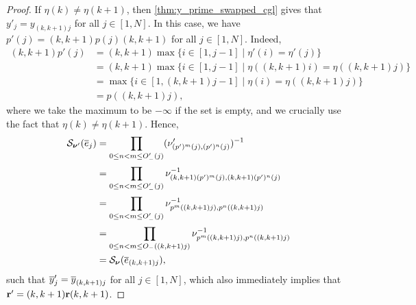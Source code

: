 \begin{proof}

	If $\eta(k) \neq \eta(k+1)$, then \cref{thm:y_prime_swapped_cgl} gives that $y'_j =
		y_{(k,k+1)j}$ for all $j \in [1, N]$. In this case, we have $p'(j) = (k, k+1)p(j)(k,
		k+1)$ for all $j\in [1,N]$. Indeed,
	\begin{align*}
		(k, k+1) p'(j) & = (k, k+1)\max\{i \in [1, j-1] \mid \eta'(i) = \eta'(j)\}                \\
		               & = (k, k+1)\max\{i \in [1, j-1] \mid \eta((k, k+1) i) = \eta((k, k+1)j)\} \\
		               & = \max\{ i \in [1, (k, k+1)j-1] \mid \eta(i) = \eta((k, k+1)j)\}         \\
		               & = p((k, k+1)j),
	\end{align*}
	where we take the maximum to be $-\infty$ if the set is empty, and we crucially use the
	fact that $\eta(k) \neq \eta(k+1)$. Hence,
	\begin{align*}
		\mathcal{S}_{\boldsymbol{\nu}'}(\overline{e}_j) & = \prod_{0 \leq n < m \leq O'_{-}(j)}(\nu'_{(p')^m (j), (p')^n (j)})^{-1}                \\
		                    & = \prod_{0 \leq n < m \leq O'_{-}(j)}\nu^{-1}_{(k, k+1)(p')^m (j), (k, k+1)(p')^n (j)}   \\
		                    & = \prod_{0 \leq n < m \leq O'_{-}(j)}\nu^{-1}_{p^m ((k, k+1)j), p^n ((k, k+1)j)}         \\
		                    & = \prod_{0 \leq n < m \leq O_{-}((k, k+1)j)}\nu^{-1}_{p^m ((k, k+1) j), p^n ((k, k+1)j)} \\
		                    & = \mathcal{S}_{\boldsymbol{\nu}}(\overline{e}_{(k, k+1)j}),
	\end{align*}
	such that $\overline{y}'_j = \overline{y}_{(k, k+1)j}$ for all $j \in [1, N]$, which also immediately
	implies that $\mathbf{r}' = (k, k+1)\mathbf{r} (k, k +1)$.


\end{proof}
